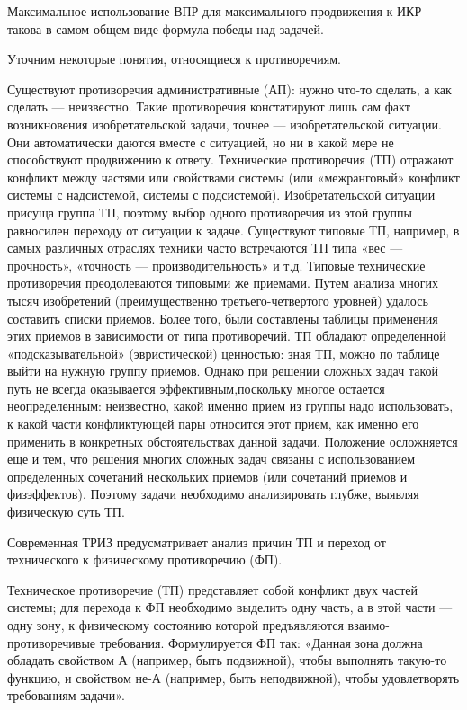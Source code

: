 Максимальное использование  ВПР для максимального продвижения  к ИКР —
такова в самом общем виде формула победы над задачей.


Уточним некоторые понятия, относящиеся к противоречиям.

Существуют противоречия административные (АП): нужно что-то сделать, а
как  сделать —  неизвестно. Такие  противоречия констатируют  лишь сам
факт возникновения изобретательской  задачи, точнее — изобретательской
ситуации. Они автоматически  даются вместе с ситуацией, но  ни в какой
мере не  способствуют продвижению  к ответу.  Технические противоречия
(ТП)  отражают  конфликт между  частями  или  свойствами системы  (или
«межранговый» конфликт системы с  надсистемой, системы с подсистемой).
Изобретательской  ситуации присуща  группа  ТП,  поэтому выбор  одного
противоречия  из  этой  группы   равносилен  переходу  от  ситуации  к
задаче. Существуют  типовые ТП,  например, в самых  различных отраслях
техники  часто  встречаются  ТП  типа  «вес  —  прочность»,  «точность
—   производительность»  и   т.д.  Типовые   технические  противоречия
преодолеваются  типовыми  же  приемами.  Путем  анализа  многих  тысяч
изобретений  (преимущественно   третьего-четвертого  уровней)  удалось
составить  списки   приемов.  Более  того,  были   составлены  таблицы
применения  этих  приемов  в  зависимости  от  типа  противоречий.  ТП
обладают  определенной «подсказывательной»  (эвристической) ценностью:
зная  ТП, можно  по таблице  выйти  на нужную  группу приемов.  Однако
при   решении  сложных   задач  такой   путь  не   всегда  оказывается
эффективным,поскольку  многое   остается  неопределенным:  неизвестно,
какой  именно  прием  из  группы  надо  использовать,  к  какой  части
конфликтующей пары  относится этот прием,  как именно его  применить в
конкретных обстоятельствах данной задачи.  Положение осложняется еще и
тем,  что  решения  многих  сложных  задач  связаны  с  использованием
определенных  сочетаний нескольких  приемов (или  сочетаний приемов  и
физэффектов). Поэтому задачи  необходимо анализировать глубже, выявляя
физическую суть ТП.

Современная  ТРИЗ  предусматривает  анализ  причин  ТП  и  переход  от
технического к физическому противоречию (ФП).

Техническое  противоречие   (ТП)  представляет  собой   конфликт  двух
частей  системы; для  перехода к  ФП необходимо  выделить одну  часть,
а  в  этой  части  —   одну  зону,  к  физическому  состоянию  которой
предъявляются взаимо-противоречивые требования.  Формулируется ФП так:
«Данная зона  должна обладать свойством А  (например, быть подвижной),
чтобы  выполнять такую-то  функцию, и  свойством не-А  (например, быть
неподвижной), чтобы удовлетворять требованиям задачи».

